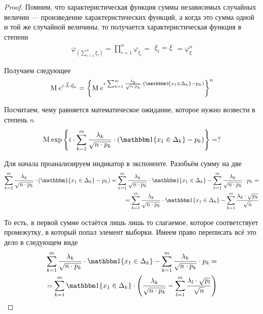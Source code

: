 \begin{proof}
    Помним, что характеристическая функция суммы независимых случайных величин
    --- произведение характеристических функций, а когда это сумма одной и той
    же случайной величины, то получается характеристическая функция в степени
    \begin{align*}
        \varphi_{\left( \sum_{i=1}^n \xi_i \right)}
        = \prod_{i=1}^n{\varphi_{\xi_i}}
        = \begin{array}{|c|}
            \xi_i = \xi
        \end{array}
        = \varphi_{\xi}^n
    \end{align*}

    Получаем следующее
    \begin{align*}
        \mean{e^{i \cdot \vec{\lambda} \cdot \vec{\eta}_n}}
        = \left\{ \mean{e^{i \cdot \sum_{k=1}^{m}\frac{\lambda_k}{
                \sqrt{n \cdot p_k}} \cdot \left(
                \Indicator{x_1 \in \Delta_k} - p_k \right)}} \right\}^n
    \end{align*}

    Посчитаем, чему равняется математическое ожидание, которое нужно возвести
    в степень $n$
    \begin{equation}\label{eq:criteriaPirson:meanPowerable}
        \mean{\exp{\left\{ i \cdot \sum_{k=1}^{m}\frac{\lambda_k}{
                \sqrt{n \cdot p_k}} \cdot \left(
                \Indicator{x_1 \in \Delta_k} - p_k \right) \right\}}} = ?
    \end{equation}

    Для начала проанализируем индикатор в экспоненте.
    Разобьём сумму на две
    \begin{align*}
        \sum_{k=1}^{m}\frac{\lambda_k}{\sqrt{n \cdot p_k}} \cdot \left(
                \Indicator{x_1 \in \Delta_k} - p_k \right)
        = \sum_{k=1}^{m}\frac{\lambda_k}{\sqrt{n \cdot p_k}}
                \cdot \Indicator{x_1 \in \Delta_k}
            - \sum_{k=1}^{m}\frac{\lambda_k}{\sqrt{n \cdot p_k}} \cdot p_k = \\
        = \sum_{k=1}^{m}\frac{\lambda_k}{\sqrt{n \cdot p_k}}
                \cdot \Indicator{x_1 \in \Delta_k}
            - \sum_{k=1}^{m}\frac{\lambda_k \cdot \sqrt{p_k}}{\sqrt{n}}
    \end{align*}

    То есть, в первой сумме остаётся лишь лишь то слагаемое, которое
    соответствует промежутку, в который попал элемент выборки. Имеем право
    переписать всё это дело в следующем виде
    \begin{align*}
        \sum_{k=1}^{m}\frac{\lambda_k}{\sqrt{n \cdot p_k}}
                \cdot \Indicator{x_1 \in \Delta_k}
            - \sum_{k=1}^{m}\frac{\lambda_k}{\sqrt{n \cdot p_k}} \cdot p_k = \\
        = \sum_{k=1}^{m} \Indicator{x_1 \in \Delta_k} \cdot \left(
            \frac{\lambda_k}{\sqrt{n \cdot p_k}} - \sum_{l=1}^{m}
                \frac{\lambda_l \cdot \sqrt{p_l}}{\sqrt{n}} \right)
    \end{align*}


\end{proof}

